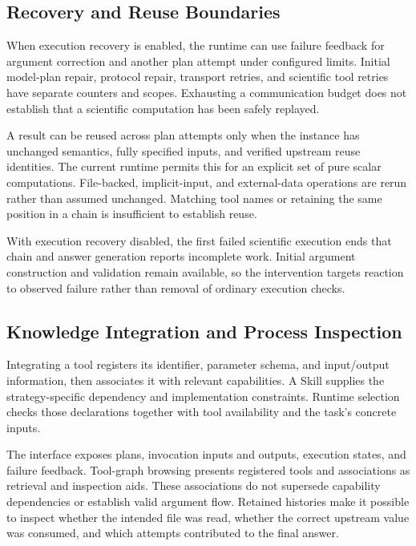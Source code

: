 \subsection{Recovery and Reuse Boundaries}
When execution recovery is enabled, the runtime can use failure feedback for argument correction and another plan attempt under configured limits. Initial model-plan repair, protocol repair, transport retries, and scientific tool retries have separate counters and scopes. Exhausting a communication budget does not establish that a scientific computation has been safely replayed.

A result can be reused across plan attempts only when the instance has unchanged semantics, fully specified inputs, and verified upstream reuse identities. The current runtime permits this for an explicit set of pure scalar computations. File-backed, implicit-input, and external-data operations are rerun rather than assumed unchanged. Matching tool names or retaining the same position in a chain is insufficient to establish reuse.

With execution recovery disabled, the first failed scientific execution ends that chain and answer generation reports incomplete work. Initial argument construction and validation remain available, so the intervention targets reaction to observed failure rather than removal of ordinary execution checks.

\subsection{Knowledge Integration and Process Inspection}
Integrating a tool registers its identifier, parameter schema, and input/output information, then associates it with relevant capabilities. A Skill supplies the strategy-specific dependency and implementation constraints. Runtime selection checks those declarations together with tool availability and the task's concrete inputs.

The interface exposes plans, invocation inputs and outputs, execution states, and failure feedback. Tool-graph browsing presents registered tools and associations as retrieval and inspection aids. These associations do not supersede capability dependencies or establish valid argument flow. Retained histories make it possible to inspect whether the intended file was read, whether the correct upstream value was consumed, and which attempts contributed to the final answer.
